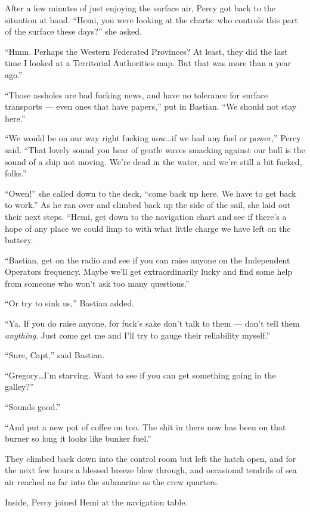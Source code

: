 \documentclass[
]{scrbook}
\begin{document}
After a few minutes of just enjoying the surface air, Percy got back to
the situation at hand. ``Hemi, you were looking at the charts: who
controls this part of the surface these days?'' she asked.

``Hmm. Perhaps the Western Federated Provinces? At least, they did the
last time I looked at a Territorial Authorities map. But that was more
than a year ago.''

``Those assholes are bad fucking news, and have no tolerance for surface
transports --- even ones that have papers,'' put in Bastian. ``We should
not stay here.''

``We would be on our way right fucking now\ldots if we had any fuel or
power,'' Percy said. ``That lovely sound you hear of gentle waves
smacking against our hull is the sound of a ship not moving. We're dead
in the water, and we're still a bit fucked, folks.''

``Owen!'' she called down to the deck, ``come back up here. We have to
get back to work.'' As he ran over and climbed back up the side of the
sail, she laid out their next steps. ``Hemi, get down to the navigation
chart and see if there's a hope of any place we could limp to with what
little charge we have left on the battery.

``Bastian, get on the radio and see if you can raise anyone on the
Independent Operators frequency. Maybe we'll get extraordinarily lucky
and find some help from someone who won't ask too many questions.''

``Or try to sink us,'' Bastian added.

``Ya. If you do raise anyone, for fuck's sake don't talk to them ---
don't tell them \emph{anything}. Just come get me and I'll try to gauge
their reliability myself.''

``Sure, Capt,'' said Bastian.

``Gregory\ldots I'm starving. Want to see if you can get something going
in the galley?''

``Sounds good.''

``And put a new pot of coffee on too. The shit in there now has been on
that burner so long it looks like bunker fuel.''

They climbed back down into the control room but left the hatch open,
and for the next few hours a blessed breeze blew through, and occasional
tendrils of sea air reached as far into the submarine as the crew
quarters.

\bigskip

Inside, Percy joined Hemi at the navigation table.
\end{document}
